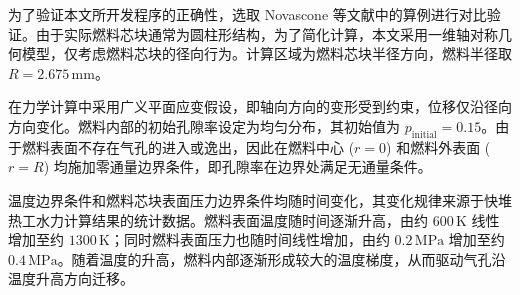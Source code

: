 为了验证本文所开发程序的正确性，选取 Novascone 等文献\cite{novasconeModelingPorosityMigration2018}中的算例进行对比验证。由于实际燃料芯块通常为圆柱形结构，为了简化计算，本文采用一维轴对称几何模型，仅考虑燃料芯块的径向行为。计算区域为燃料芯块半径方向，燃料半径取 $R=2.675\,\mathrm{mm}$。

在力学计算中采用广义平面应变假设，即轴向方向的变形受到约束，位移仅沿径向方向变化。燃料内部的初始孔隙率设定为均匀分布，其初始值为 $p_{\mathrm{initial}}=0.15$。由于燃料表面不存在气孔的进入或逸出，因此在燃料中心 ($r=0$) 和燃料外表面 ($r=R$) 均施加零通量边界条件，即孔隙率在边界处满足无通量条件。

温度边界条件和燃料芯块表面压力边界条件均随时间变化，其变化规律来源于快堆热工水力计算结果的统计数据。燃料表面温度随时间逐渐升高，由约 $600\,\mathrm{K}$ 线性增加至约 $1300\,\mathrm{K}$；同时燃料表面压力也随时间线性增加，由约 $0.2\,\mathrm{MPa}$ 增加至约 $0.4\,\mathrm{MPa}$。随着温度的升高，燃料内部逐渐形成较大的温度梯度，从而驱动气孔沿温度升高方向迁移。

